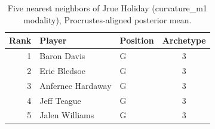 \begin{table}[htbp]
  \centering\small
  \begin{tabular}{rllc}
    \toprule
    Rank & Player & Position & Archetype \\
    \midrule
    1 & Baron Davis & G & 3 \\
    2 & Eric Bledsoe & G & 3 \\
    3 & Anfernee Hardaway & G & 3 \\
    4 & Jeff Teague & G & 3 \\
    5 & Jalen Williams & G & 3 \\
    \bottomrule
  \end{tabular}
  \caption{Five nearest neighbors of Jrue Holiday (curvature_m1 modality), Procrustes-aligned posterior mean.}
  \label{tab:Jrue_Holiday_neighbors_curvature_m1}
\end{table}

